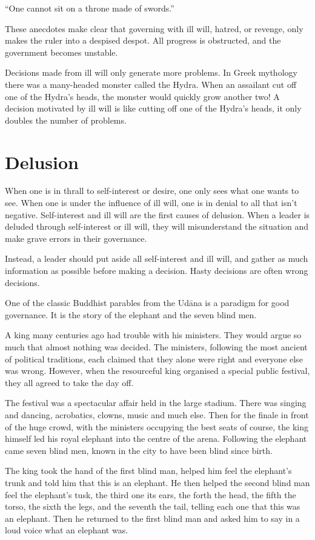 \documentclass[11pt, openany]{book}
\begin{document}
“One cannot sit on a throne made of swords.”

These anecdotes make clear that governing with ill will, hatred, or revenge, only makes the ruler into a despised despot. All progress is obstructed, and the government becomes unstable.

Decisions made from ill will only generate more problems. In Greek mythology there was a many-headed monster called the Hydra. When an assailant cut off one of the Hydra’s heads, the monster would quickly grow another two! A decision motivated by ill will is like cutting off one of the Hydra’s heads, it only doubles the number of problems.

\section{Delusion}

When one is in thrall to self-interest or desire, one only sees what one wants to see. When one is under the influence of ill will, one is in denial to all that isn’t negative. Self-interest and ill will are the first causes of delusion. When a leader is deluded through self-interest or ill will, they will misunderstand the situation and make grave errors in their governance.

Instead, a leader should put aside all self-interest and ill will, and gather as much information as possible before making a decision. Hasty decisions are often wrong decisions.

One of the classic Buddhist parables from the Udāna is a paradigm for good governance. It is the story of the elephant and the seven blind men.

A king many centuries ago had trouble with his ministers. They would argue so much that almost nothing was decided. The ministers, following the most ancient of political traditions, each claimed that they alone were right and everyone else was wrong. However, when the resourceful king organised a special public festival, they all agreed to take the day off.

The festival was a spectacular affair held in the large stadium. There was singing and dancing, acrobatics, clowns, music and much else. Then for the finale in front of the huge crowd, with the ministers occupying the best seats of course, the king himself led his royal elephant into the centre of the arena. Following the elephant came seven blind men, known in the city to have been blind since birth.

The king took the hand of the first blind man, helped him feel the elephant’s trunk and told him that this is an elephant. He then helped the second blind man feel the elephant’s tusk, the third one its ears, the forth the head, the fifth the torso, the sixth the legs, and the seventh the tail, telling each one that this was an elephant. Then he returned to the first blind man and asked him to say in a loud voice what an elephant was.
\end{document}
